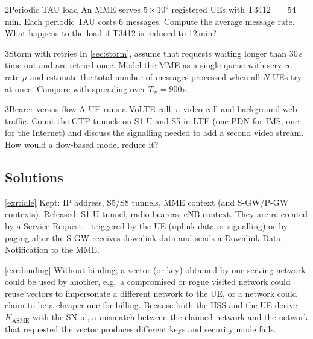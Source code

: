 \documentclass[11pt,a4paper]{article}
\begin{document}
\begin{exercisebox}{2}{Periodic TAU load}\label{exr:tau}
An MME serves $5\times10^6$ registered UEs with T3412 $=$ 54\,min. Each periodic TAU costs 6 messages.
Compute the average message rate. What happens to the load if T3412 is reduced to 12\,min?
\end{exercisebox}

\begin{exercisebox}{3}{Storm with retries}\label{exr:storm}
In \cref{sec:storm}, assume that requests waiting longer than 30\,s time out and are retried once. Model the
MME as a single queue with service rate $\mu$ and estimate the total number of messages processed when all
$N$ UEs try at once. Compare with spreading over $T_\mathrm{w} = 900$\,s.
\end{exercisebox}

\begin{exercisebox}{3}{Bearer versus flow}\label{exr:flows}
A UE runs a VoLTE call, a video call and background web traffic. Count the GTP tunnels on S1-U and S5 in LTE
(one PDN for IMS, one for the Internet) and discuss the signalling needed to add a second video stream. How
would a flow-based model reduce it?
\end{exercisebox}

\subsection*{Solutions}

\begin{solutionbox}{\ref{exr:idle}}
Kept: IP address, S5/S8 tunnels, MME context (and S-GW/P-GW contexts). Released: S1-U tunnel, radio bearers,
eNB context. They are re-created by a Service Request -- triggered by the UE (uplink data or signalling) or by
paging after the S-GW receives downlink data and sends a Downlink Data Notification to the MME.
\end{solutionbox}

\begin{solutionbox}{\ref{exr:binding}}
Without binding, a vector (or key) obtained by one serving network could be used by another, e.g.\ a
compromised or rogue visited network could reuse vectors to impersonate a different network to the UE, or a
network could claim to be a cheaper one for billing. Because both the HSS and the UE derive
$K_{\mathrm{ASME}}$ with the SN id, a mismatch between the claimed network and the network that requested the
vector produces different keys and security mode fails.
\end{solutionbox}
\end{document}
